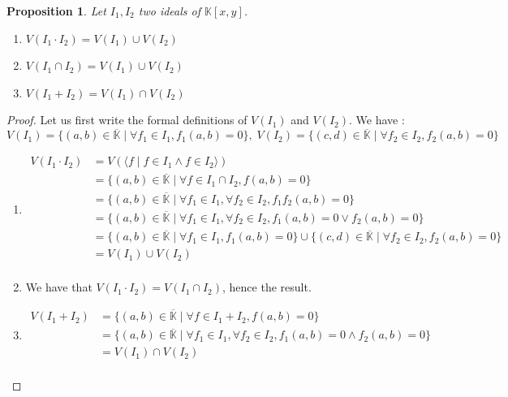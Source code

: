 \documentclass{article}
\newtheorem{proposition}{Proposition}[section]
\begin{document}
\begin{proposition}
    Let $I_{1}, I_{2}$ two ideals of $\mathbb{K}[x, y]$. 
    \begin{enumerate}
        \item[(i)] $V(I_{1} \cdot I_{2}) = V(I_{1}) \cup V(I_{2})$
        \item[(ii)] $V(I_{1} \cap I_{2}) = V(I_{1}) \cup V(I_{2})$
        \item[(iii)] $V(I_{1} + I_{2}) = V(I_{1}) \cap V(I_{2})$
    \end{enumerate}
\end{proposition}
    
\begin{proof}
    Let us first write the formal definitions of $V(I_{1})$ and $V(I_{2})$. We have : \\
    \begin{displaymath}
        V(I_{1}) = \{ (a, b) \in \overline{\mathbb{K}} \mid \forall f_{1} \in I_{1}, f_{1}(a, b) = 0 \}, \;
        V(I_{2}) = \{ (c, d) \in \overline{\mathbb{K}} \mid \forall f_{2} \in I_{2}, f_{2}(a, b) = 0 \} 
    \end{displaymath}
    \begin{enumerate}
        \item[(i)] 
        \begin{align*}
            V(I_{1} \cdot I_{2})
            & = V( \langle f \mid f \in I_{1} \land f \in I_{2} \rangle) \\
            & = \{(a, b) \in \overline{\mathbb{K}} \mid \forall f \in I_{1} \cap I_{2}, f(a, b) = 0\} \\
            & = \{ (a, b) \in \overline{\mathbb{K}} \mid \forall f_{1} \in I_{1}, \forall f_{2} \in I_{2}, f_{1}f_{2}(a, b) = 0 \} \\ %
            & = \{ (a, b) \in \overline{\mathbb{K}} \mid \forall f_{1} \in I_{1}, \forall f_{2} \in I_{2}, f_{1}(a, b) = 0 \lor f_{2}(a, b) = 0 \} \\
            & = \{ (a, b) \in \overline{\mathbb{K}} \mid \forall f_{1} \in I_{1}, f_{1}(a, b) = 0 \} \cup 
            \{ (c, d) \in \overline{\mathbb{K}} \mid \forall f_{2} \in I_{2}, f_{2}(a, b) = 0 \} \\
            & = V(I_{1}) \cup V(I_{2}) \\
        \end{align*}
        \item[(ii)] We have that $V(I_{1} \cdot I_{2}) = V(I_{1} \cap I_{2})$, hence the result.
        \item[(iii)] 
        \begin{align*} 
            V(I_{1} + I_{2}) 
            & = \{ (a, b) \in \overline{\mathbb{K}} \mid \forall f \in I_{1} + I_{2}, f(a, b) = 0\} \\
            & = \{ (a, b) \in \overline{\mathbb{K}} \mid \forall f_{1} \in I_{1}, \forall f_{2} \in I_{2}, f_{1}(a, b) = 0 \land f_{2}(a, b) = 0 \} \\
            & = V(I_{1}) \cap V(I_{2}) \\
        \end{align*}
    \end{enumerate}
\end{proof}
\end{document}
